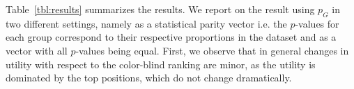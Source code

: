 %
Table~\ref{tbl:results} summarizes the results. We report on the result using $p_G$ in two different settings, namely as a statistical parity vector i.e. the $p$-values for each group correspond to their respective proportions in the dataset and as a vector with all $p$-values being equal. 
%
First, we observe that in general changes in utility with respect to the color-blind ranking are minor, as the utility is dominated by the top positions, which do not change dramatically.
%


